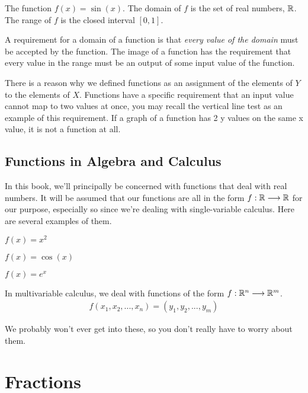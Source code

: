 \begin{example}
The function $f(x) = \sin(x)$. The domain of $f$ is the set of real numbers, $\mathbb{R}$. The range of $f$ is the closed interval $[0, 1]$. 
\end{example}

A requirement for a domain of a function is that \textit{every value of the domain} must be accepted by the function. The image of a function has the requirement that every value in the range must be an output of some input value of the function. 

There is a reason why we defined functions as an assignment of the elements of $Y$ to the elements of $X$. Functions have a specific requirement that an input value cannot map to two values at once, you may recall the vertical line test as an example of this requirement. If a graph of a function has 2 y values on the same x value, it is not a function at all.

\subsection{Functions in Algebra and Calculus}

In this book, we'll principally be concerned with functions that deal with real numbers. It will be assumed that our functions are all in the form $f : \mathbb{R} \longrightarrow \mathbb{R}$ for our purpose, especially so since we're dealing with single-variable calculus. Here are several examples of them.

\begin{example}
$f(x) = x^2$
\end{example}

\begin{example}
$f(x) = \cos(x)$
\end{example}

\begin{example}
$f(x) = e^x$
\end{example}

In multivariable calculus, we deal with functions of the form $f : \mathbb{R}^n \longrightarrow \mathbb{R}^m$. 
\begin{align*}
    f(x_1, x_2, ..., x_n) = (y_1, y_2, ..., y_m)
\end{align*}

We probably won't ever get into these, so you don't really have to worry about them. 

\section{Fractions}

